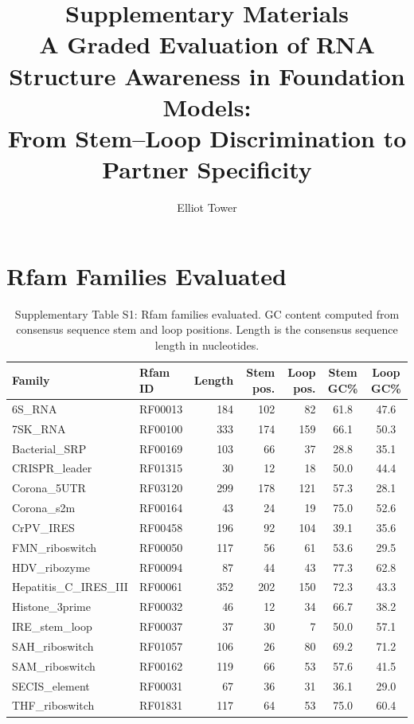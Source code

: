 \documentclass[11pt]{article}
\title{Supplementary Materials\\[0.5em]
\large A Graded Evaluation of RNA Structure Awareness in Foundation Models:\\
From Stem--Loop Discrimination to Partner Specificity}
\author{Elliot Tower}
\date{}
\begin{document}
\maketitle

\tableofcontents
\clearpage

\section{Rfam Families Evaluated}
\label{supp:families}

\begin{table}[htbp]
\centering
\caption{Supplementary Table S1: Rfam families evaluated. GC content computed from consensus sequence stem and loop positions. Length is the consensus sequence length in nucleotides.}
\label{tab:s1}
\small
\begin{tabular}{llrrrcc}
\toprule
\textbf{Family} & \textbf{Rfam ID} & \textbf{Length} & \textbf{Stem pos.} & \textbf{Loop pos.} & \textbf{Stem GC\%} & \textbf{Loop GC\%} \\
\midrule
6S\_RNA & RF00013 & 184 & 102 & 82 & 61.8 & 47.6 \\
7SK\_RNA & RF00100 & 333 & 174 & 159 & 66.1 & 50.3 \\
Bacterial\_SRP & RF00169 & 103 & 66 & 37 & 28.8 & 35.1 \\
CRISPR\_leader & RF01315 & 30 & 12 & 18 & 50.0 & 44.4 \\
Corona\_5UTR & RF03120 & 299 & 178 & 121 & 57.3 & 28.1 \\
Corona\_s2m & RF00164 & 43 & 24 & 19 & 75.0 & 52.6 \\
CrPV\_IRES & RF00458 & 196 & 92 & 104 & 39.1 & 35.6 \\
FMN\_riboswitch & RF00050 & 117 & 56 & 61 & 53.6 & 29.5 \\
HDV\_ribozyme & RF00094 & 87 & 44 & 43 & 77.3 & 62.8 \\
Hepatitis\_C\_IRES\_III & RF00061 & 352 & 202 & 150 & 72.3 & 43.3 \\
Histone\_3prime & RF00032 & 46 & 12 & 34 & 66.7 & 38.2 \\
IRE\_stem\_loop & RF00037 & 37 & 30 & 7 & 50.0 & 57.1 \\
SAH\_riboswitch & RF01057 & 106 & 26 & 80 & 69.2 & 71.2 \\
SAM\_riboswitch & RF00162 & 119 & 66 & 53 & 57.6 & 41.5 \\
SECIS\_element & RF00031 & 67 & 36 & 31 & 36.1 & 29.0 \\
THF\_riboswitch & RF01831 & 117 & 64 & 53 & 75.0 & 60.4 \\

\end{tabular}
\end{table}
\end{document}
